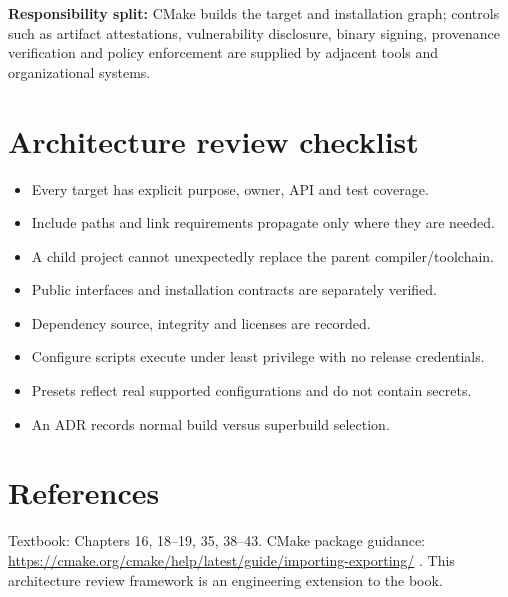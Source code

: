 \documentclass[11pt,letterpaper,oneside]{report}
\providecommand{\tightlist}{\setlength{\itemsep}{0pt}\setlength{\parskip}{0pt}}
\begin{document}
\textbf{Responsibility split:} CMake builds the target and installation
graph; controls such as artifact attestations, vulnerability disclosure,
binary signing, provenance verification and policy enforcement are
supplied by adjacent tools and organizational systems.

\chapter{Architecture review
checklist}\label{architecture-review-checklist}

\begin{itemize}
\tightlist
\item[$\square$]
  Every target has explicit purpose, owner, API and test coverage.
\item[$\square$]
  Include paths and link requirements propagate only where they are
  needed.
\item[$\square$]
  A child project cannot unexpectedly replace the parent
  compiler/toolchain.
\item[$\square$]
  Public interfaces and installation contracts are separately verified.
\item[$\square$]
  Dependency source, integrity and licenses are recorded.
\item[$\square$]
  Configure scripts execute under least privilege with no release
  credentials.
\item[$\square$]
  Presets reflect real supported configurations and do not contain
  secrets.
\item[$\square$]
  An ADR records normal build versus superbuild selection.
\end{itemize}

\chapter{References}\label{references}

Textbook: Chapters 16, 18--19, 35, 38--43. CMake package guidance:
\url{https://cmake.org/cmake/help/latest/guide/importing-exporting/} .
This architecture review framework is an engineering extension to the
book.
\end{document}

